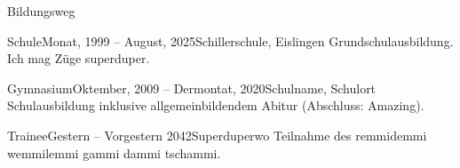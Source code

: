 \documentclass{application-maverick}
\begin{document}

    \begin{ap-page}

        \begin{block}[\faGraduationCap]{Bildungsweg}
            \begin{timeline}
                \begin{event}{Schule}{Monat, 1999 -- August, 2025}{Schillerschule, Eislingen}
                    Grundschulausbildung. Ich mag Züge superduper.
                \end{event}
                \begin{event}{Gymnasium}{Oktember, 2009 -- Dermontat, 2020}{Schulname, Schulort}
                    Schulausbildung inklusive allgemeinbildendem Abitur (Abschluss: Amazing).
                \end{event}
                \begin{event}{Trainee}{Gestern -- Vorgestern 2042}{Superduperwo}
                    Teilnahme des remmidemmi wemmilemmi gammi dammi tschammi.
                \end{event}
            \end{timeline}
        \end{block}



\end{ap-page}
\end{document}
